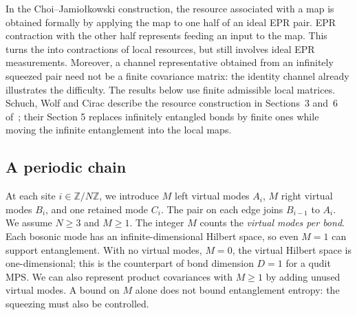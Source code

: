 In the Choi--Jamio{\l}kowski construction, the resource associated with a map
is obtained formally by applying the map to one half of an ideal EPR pair.
EPR contraction with the other half represents feeding an input to the map.
This turns the  into contractions of local resources, but
still involves ideal EPR measurements. Moreover, a channel representative obtained
from an infinitely squeezed pair need not be a finite covariance matrix: the
identity channel already illustrates the difficulty. The results below use
finite admissible local matrices. Schuch, Wolf and Cirac describe the resource
construction in Sections~3 and~6 of~\cite{schuch};
their Section 5 replaces infinitely entangled bonds by finite ones while moving
the infinite entanglement into the local maps.

\subsection{A periodic chain}
At each site $i\in\mathbb Z/N\mathbb Z$, we introduce $M$ left virtual modes $A_i$,
$M$ right virtual modes $B_i$, and one retained mode $C_i$.
The pair on each edge joins $B_{i-1}$ to $A_i$. We assume $N\geq3$ and $M\geq1$.
The integer $M$ counts the \emph{virtual modes per bond}. Each bosonic mode has
an infinite-dimensional Hilbert space, so even $M=1$ can support entanglement.
With no virtual modes, $M=0$, the virtual Hilbert space is one-dimensional;
this is the counterpart of bond dimension $D=1$ for a qudit MPS. We can also
represent product covariances with $M\geq1$ by adding unused virtual modes.
A bound on $M$ alone does not bound entanglement entropy: the squeezing must
also be controlled.

